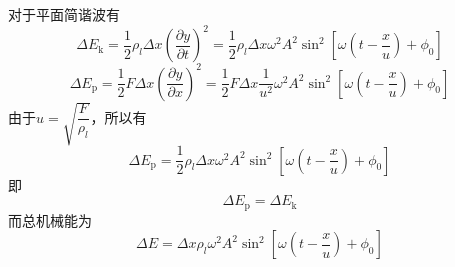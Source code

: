 对于平面简谐波有
\begin{equation}
\Delta E_{\mathrm{k}}=\frac{1}{2} \rho_{l} \Delta x\left(\frac{\partial y}{\partial t}\right)^{2}=\frac{1}{2} \rho_{l} \Delta x \omega^{2} A^{2} \sin ^{2}\left[\omega\left(t-\frac{x}{u}\right)+\phi_{0}\right]
\end{equation}
\begin{equation}
\Delta E_{\mathrm{p}}=\frac{1}{2} F \Delta x\left(\frac{\partial y}{\partial x}\right)^{2}=\frac{1}{2} F \Delta x \frac{1}{u^{2}} \omega^{2} A^{2} \sin ^{2}\left[\omega\left(t-\frac{x}{u}\right)+\phi_{0}\right]
\end{equation}
由于$u=\sqrt{\dfrac{F}{\rho_{l}}}$，所以有
\begin{equation}
\Delta E_{\mathrm{p}}=\frac{1}{2} \rho_{l} \Delta x \omega^{2} A^{2} \sin ^{2}\left[\omega\left(t-\frac{x}{u}\right)+\phi_{0}\right]
\end{equation}
即
\begin{equation}
\Delta E_{\mathrm{p}}=\Delta E_{\mathrm{k}}
\end{equation}
而总机械能为
\begin{equation}
\Delta E=\Delta x \rho_{l} \omega^{2} A^{2} \sin ^{2}\left[\omega\left(t-\frac{x}{u}\right)+\phi_{0}\right]
\end{equation}